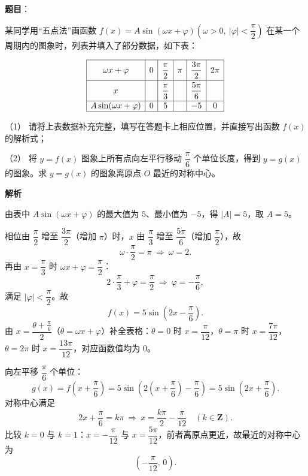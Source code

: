 \begin{answer}

\textbf{题目}：

某同学用“五点法”画函数 \(f(x)=A\sin(\omega x+\varphi)\left(\omega>0,\ |\varphi|<\dfrac{\pi}{2}\right)\) 在某一个周期内的图象时，列表并填入了部分数据，如下表：

\nopagebreak[4]
\[
\begin{array}{|c|c|c|c|c|c|}
\hline
\rule{0pt}{1.5em}\omega x+\varphi & 0 & \dfrac{\pi}{2} & \pi & \dfrac{3\pi}{2} & 2\pi\\[0.55em]
\hline
\rule{0pt}{1.5em}x & & \dfrac{\pi}{3} & & \dfrac{5\pi}{6} & \\[0.55em]
\hline
A\sin(\omega x+\varphi) & 0 & 5 & & -5 & 0\\
\hline
\end{array}
\]

（1） 请将上表数据补充完整，填写在答题卡上相应位置，并直接写出函数 \(f(x)\) 的解析式；

（2） 将 \(y=f(x)\) 图象上所有点向左平行移动 \(\dfrac{\pi}{6}\) 个单位长度，得到 \(y=g(x)\) 的图象。求 \(y=g(x)\) 的图象离原点 \(O\) 最近的对称中心。

\textbf{解析}


由表中 \(A\sin(\omega x+\varphi)\) 的最大值为 \(5\)、最小值为 \(-5\)，得 \(|A|=5\)，取 \(A=5\)。

相位由 \(\dfrac{\pi}{2}\) 增至 \(\dfrac{3\pi}{2}\)（增加 \(\pi\)）时，\(x\) 由 \(\dfrac{\pi}{3}\) 增至 \(\dfrac{5\pi}{6}\)（增加 \(\dfrac{\pi}{2}\)），故
\nopagebreak[4]
\[
\omega\cdot\frac{\pi}{2}=\pi\ \Longrightarrow\ \omega=2.
\]
再由 \(x=\dfrac{\pi}{3}\) 时 \(\omega x+\varphi=\dfrac{\pi}{2}\)：
\nopagebreak[4]
\[
2\cdot\frac{\pi}{3}+\varphi=\frac{\pi}{2}
\ \Longrightarrow\ \varphi=-\frac{\pi}{6},
\]
满足 \(|\varphi|<\dfrac{\pi}{2}\)。故
\nopagebreak[4]
\[
f(x)=5\sin\left(2x-\frac{\pi}{6}\right).
\]
由 \(x=\dfrac{\theta+\frac{\pi}{6}}{2}\)（\(\theta=\omega x+\varphi\)）补全表格：\(\theta=0\) 时 \(x=\dfrac{\pi}{12}\)，\(\theta=\pi\) 时 \(x=\dfrac{7\pi}{12}\)，\(\theta=2\pi\) 时 \(x=\dfrac{13\pi}{12}\)，对应函数值均为 \(0\)。


向左平移 \(\dfrac{\pi}{6}\) 个单位：
\nopagebreak[4]
\[
g(x)=f\left(x+\frac{\pi}{6}\right)
=5\sin\left(2\left(x+\frac{\pi}{6}\right)-\frac{\pi}{6}\right)
=5\sin\left(2x+\frac{\pi}{6}\right).
\]
对称中心满足
\nopagebreak[4]
\[
2x+\frac{\pi}{6}=k\pi\ \Longrightarrow\ x=\frac{k\pi}{2}-\frac{\pi}{12}\quad(k\in\mathbf{Z}).
\]
比较 \(k=0\) 与 \(k=1\)：\(x=-\dfrac{\pi}{12}\) 与 \(x=\dfrac{5\pi}{12}\)，前者离原点更近，故最近的对称中心为
\nopagebreak[4]
\[
\left(-\frac{\pi}{12},\,0\right).
\]


\end{answer}

